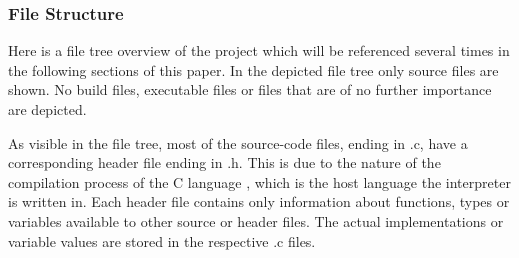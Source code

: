 \documentclass[12pt,a4paper]{report}
\newcommand{\cte}[1] {
    \cite{#1}
}
\begin{document}
\subsubsection{File Structure}
Here is a file tree overview of the project which will be referenced
several times in the following sections of this paper. In the depicted file tree
only source files are shown. No build files, executable files or files that
are of no further importance are depicted.
\begin{flushleft}
    \scriptsize\singlespacing\setlength{\DTbaselineskip}{9pt}
\end{flushleft}

As visible in the file tree, most of the source-code files, ending in .c,
have a corresponding header file ending in .h. This is due to the nature
of the compilation process of the C language\cte{c_compilation}, which is the host language
the \name interpreter is written in.
Each header file contains only information about functions, types or variables
available to other source or header files. The actual implementations or 
variable values are stored in the respective .c files.
\end{document}
